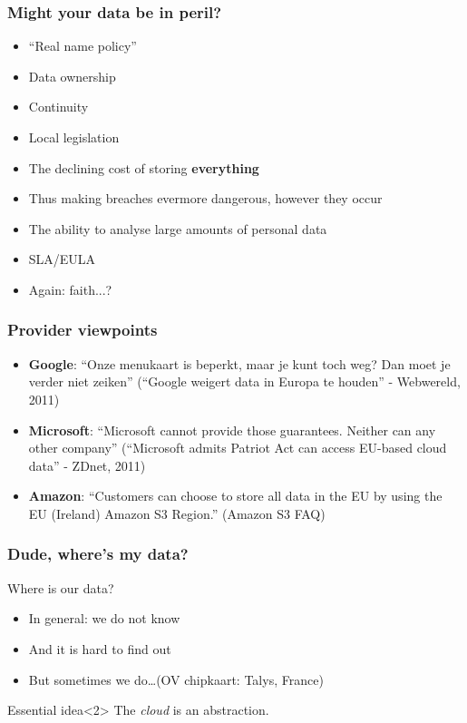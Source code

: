 \documentclass{beamer}
\begin{document}
\begin{frame}
    \frametitle{Might your data be in peril?}
    \begin{itemize}
        \item ``Real name policy''
        \item Data ownership
        \item Continuity
        \item Local legislation %
        \item The declining cost of storing \textbf{everything}
        \item Thus making breaches evermore dangerous, however they occur
        \item The ability to analyse large amounts of personal data
        \item SLA/EULA
        \item Again: faith...?
    \end{itemize}
\end{frame}

\begin{frame}
    \frametitle{Provider viewpoints}
    \begin{itemize}
        \item \textbf{Google}: ``Onze menukaart is beperkt, maar je kunt toch weg? Dan moet
        je verder niet zeiken'' (``Google weigert data in Europa te houden'' -
        Webwereld, 2011)
    \item \textbf{Microsoft}: ``Microsoft cannot provide those guarantees. Neither can
        any other company'' (``Microsoft admits Patriot Act can access EU-based
        cloud data'' - ZDnet, 2011)
    \item \textbf{Amazon}: ``Customers can choose to store all data in the EU by using
        the EU (Ireland) Amazon S3 Region.'' (Amazon S3 FAQ)
    \end{itemize}
\end{frame}

\begin{frame}
    \frametitle{Dude, where's my data?}
    Where is our data?
    \begin{itemize}
        \item In general: we do not know
        \item And it is hard to find out
        \item But sometimes we do\dots (OV chipkaart: Talys, France)
    \end{itemize}

    \begin{block}{Essential idea}<2>
    The \emph{cloud} is an abstraction.
    \end{block}
\end{frame}
\end{document}
